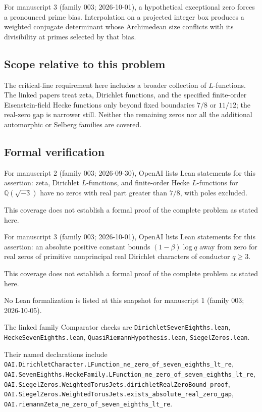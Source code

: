 \documentclass[11pt]{article}
\begin{document}
For manuscript 3 (family 003; 2026-10-01), a hypothetical exceptional zero forces a pronounced prime bias. Interpolation on a projected integer box produces a weighted conjugate determinant whose Archimedean size conflicts with its divisibility at primes selected by that bias.

\subsection{Scope relative to this problem}
The critical-line requirement here includes a broader collection of $L$-functions. The linked papers treat zeta, Dirichlet functions, and the specified finite-order Eisenstein-field Hecke functions only beyond fixed boundaries $7/8$ or $11/12$; the real-zero gap is narrower still. Neither the remaining zeros nor all the additional automorphic or Selberg families are covered.

\subsection{Formal verification}
For manuscript 2 (family 003; 2026-09-30), OpenAI lists Lean statements for this assertion: zeta, Dirichlet $L$-functions, and finite-order Hecke $L$-functions for $\mathbb Q(\sqrt{-3})$ have no zeros with real part greater than $7/8$, with poles excluded.

This coverage does not establish a formal proof of the complete problem as stated here.

For manuscript 3 (family 003; 2026-10-01), OpenAI lists Lean statements for this assertion: an absolute positive constant bounds $(1-\beta)\log q$ away from zero for real zeros of primitive nonprincipal real Dirichlet characters of conductor $q\ge3$.

This coverage does not establish a formal proof of the complete problem as stated here.

No Lean formalization is listed at this snapshot for manuscript 1 (family 003; 2026-10-05).

The linked family Comparator checks are \texttt{DirichletSevenEighths.lean}, \texttt{HeckeSevenEighths.lean}, \texttt{QuasiRiemannHypothesis.lean}, \texttt{SiegelZeros.lean}.

Their named declarations include \texttt{OAI.DirichletCharacter.LFunction\_ne\_zero\_of\_seven\_eighths\_lt\_re}, \texttt{OAI.SevenEighths.HeckeFamily.LFunction\_ne\_zero\_of\_seven\_eighths\_lt\_re}, \texttt{OAI.SiegelZeros.WeightedTorusJets.dirichletRealZeroBound\_proof}, \texttt{OAI.SiegelZeros.WeightedTorusJets.exists\_absolute\_real\_zero\_gap}, \texttt{OAI.riemannZeta\_ne\_zero\_of\_seven\_eighths\_lt\_re}.
\end{document}
